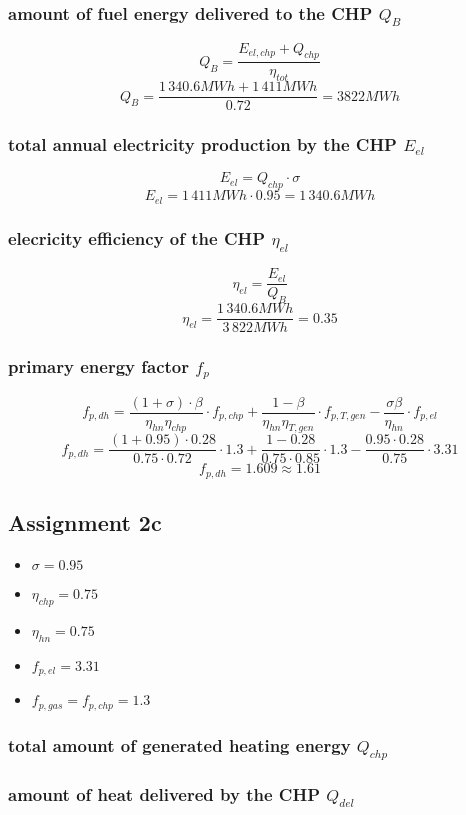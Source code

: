 \documentclass{article}
\begin{document}
		\subsubsection*{amount of fuel energy delivered to the CHP $Q_B$}
			$$Q_B=\frac{E_{el,chp}+Q_{chp}}{\eta_{tot}}$$
			$$Q_B=\frac{1\,340.6MWh+1\,411MWh}{0.72}=3822MWh$$
		\subsubsection*{total annual electricity production by the CHP $E_{el}$}
			$$E_{el}=Q_{chp}\cdot \sigma$$
			$$E_{el}=1\,411MWh\cdot 0.95 = 1\,340.6MWh$$
		\subsubsection*{elecricity efficiency of the CHP $\eta_{el}$}
			$$\eta_{el}=\frac{E_{el}}{Q_B}$$
			$$\eta_{el}=\frac{1\,340.6MWh}{3\,822MWh}=0.35$$
		\subsubsection*{primary energy factor $f_p$}
			$$f_{p,dh}=\frac{(1+\sigma)\cdot\beta}{\eta_{hn}\eta_{chp}}\cdot f_{p,chp}+\frac{1-\beta}{\eta_{hn}\eta_{T,gen}}\cdot f_{p,T,gen}-\frac{\sigma\beta}{\eta_{hn}}\cdot f_{p,el}$$
			$$f_{p,dh}=\frac{(1+0.95)\cdot 0.28}{0.75\cdot 0.72}\cdot 1.3+\frac{1-0.28}{0.75\cdot 0.85}\cdot 1.3-\frac{0.95\cdot 0.28}{0.75}\cdot 3.31$$
			$$f_{p,dh}=1.609\approx 1.61$$

	\newpage
	\subsection*{Assignment 2c}
		\begin{itemize}
			\item $\sigma=0.95$
			\item $\eta_{chp}=0.75$
			\item $\eta_{hn}=0.75$
			\item $f_{p,el}=3.31$
			\item $f_{p,gas}=f_{p,chp}=1.3$
		\end{itemize}

		\subsubsection*{total amount of generated heating energy $Q_{chp}$}

		\subsubsection*{amount of heat delivered by the CHP $Q_{del}$}
\end{document}
